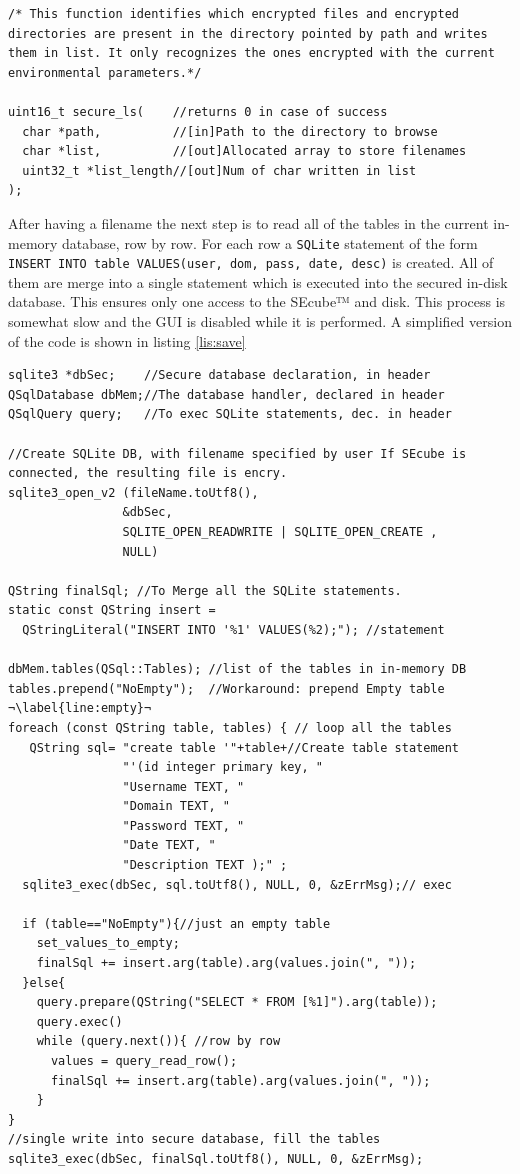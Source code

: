 \begin{lstlisting}[style=customc, float=htb, caption={\texttt{secure\_ls} declaration}, label = {lis:securels}]
 /* This function identifies which encrypted files and encrypted directories are present in the directory pointed by path and writes them in list. It only recognizes the ones encrypted with the current environmental parameters.*/
 
uint16_t secure_ls(    //returns 0 in case of success
  char *path,          //[in]Path to the directory to browse
  char *list,          //[out]Allocated array to store filenames
  uint32_t *list_length//[out]Num of char written in list
);
\end{lstlisting}


After having a filename the next step is to read all of the tables in the current in-memory database, row by row. For each row a \texttt{SQLite} statement of the form \texttt{INSERT INTO table VALUES(user, dom, pass, date, desc)} is created. All of them are merge into a single statement which is executed into the secured in-disk database. This ensures only one access to the SEcube™ and disk. This process is somewhat slow and the GUI is disabled while it is performed. A simplified version of the code is shown in listing \ref{lis:save} 

\begin{lstlisting}[style=customc, float=htb, caption={simplified Save process}, label = {lis:save}, escapechar=¬]
sqlite3 *dbSec;    //Secure database declaration, in header
QSqlDatabase dbMem;//The database handler, declared in header 
QSqlQuery query;   //To exec SQLite statements, dec. in header

//Create SQLite DB, with filename specified by user If SEcube is connected, the resulting file is encry.
sqlite3_open_v2 (fileName.toUtf8(),   
                &dbSec, 
                SQLITE_OPEN_READWRITE | SQLITE_OPEN_CREATE , 
                NULL) 
                
QString finalSql; //To Merge all the SQLite statements.
static const QString insert = 
  QStringLiteral("INSERT INTO '%1' VALUES(%2);"); //statement
  
dbMem.tables(QSql::Tables); //list of the tables in in-memory DB
tables.prepend("NoEmpty");  //Workaround: prepend Empty table   ¬\label{line:empty}¬
foreach (const QString table, tables) { // loop all the tables
   QString sql= "create table '"+table+//Create table statement 
                "'(id integer primary key, "
                "Username TEXT, "
                "Domain TEXT, "
                "Password TEXT, "
                "Date TEXT, "
                "Description TEXT );" ; 
  sqlite3_exec(dbSec, sql.toUtf8(), NULL, 0, &zErrMsg);// exec
  
  if (table=="NoEmpty"){//just an empty table
    set_values_to_empty;
    finalSql += insert.arg(table).arg(values.join(", "));
  }else{
    query.prepare(QString("SELECT * FROM [%1]").arg(table));
    query.exec()
    while (query.next()){ //row by row
      values = query_read_row();
      finalSql += insert.arg(table).arg(values.join(", "));
    }
}
//single write into secure database, fill the tables
sqlite3_exec(dbSec, finalSql.toUtf8(), NULL, 0, &zErrMsg);
\end{lstlisting}

